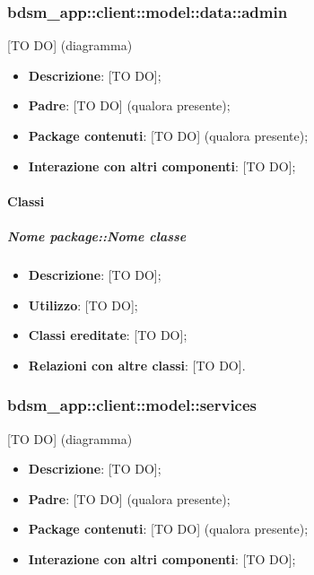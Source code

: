 	\subsubsection{bdsm\_app::client::model::data::admin} %
	\label{ssub:bdsm_app_client_model_data_admin}
	[TO DO] (diagramma) \newline \newline

	\begin{itemize}
		\item \textbf{Descrizione}: [TO DO];
		\item \textbf{Padre}: [TO DO] (qualora presente);
		\item \textbf{Package contenuti}: [TO DO] (qualora presente);
		\item \textbf{Interazione con altri componenti}: [TO DO];
	\end{itemize}

		\paragraph{Classi} %
			\subparagraph{Nome package::Nome classe} %
			\label{subp:subparagraph_name}
				\begin{itemize}
					\item \textbf{Descrizione}: [TO DO];
					\item \textbf{Utilizzo}: [TO DO];
					\item \textbf{Classi ereditate}: [TO DO];
					\item \textbf{Relazioni con altre classi}: [TO DO].
				\end{itemize}	


	\subsubsection{bdsm\_app::client::model::services} %
	\label{ssub:bdsm_app_client_model_services}
	[TO DO] (diagramma) \newline \newline

	\begin{itemize}
		\item \textbf{Descrizione}: [TO DO];
		\item \textbf{Padre}: [TO DO] (qualora presente);
		\item \textbf{Package contenuti}: [TO DO] (qualora presente);
		\item \textbf{Interazione con altri componenti}: [TO DO];
	\end{itemize}

